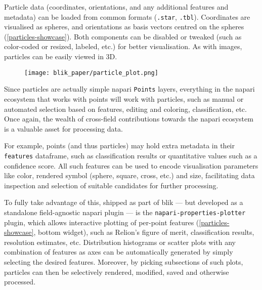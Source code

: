 Particle data (coordinates, orientations, and any additional features and metadata) can be loaded from common formats (\texttt{.star}, \texttt{.tbl}). Coordinates are visualised as spheres, and orientations as basis vectors centred on the spheres (\autoref{particles-showcase}). Both components can be disabled or tweaked (such as color-coded or resized, labeled, etc.) for better visualisation. As with images, particles can be easily viewed in 3D.

\begin{figure}[!ht]
    \centering
    \texttt{[image: blik\_paper/particle\_plot.png]}
    \label{particles-showcase}
\end{figure}

Since particles are actually simple napari \texttt{Points} layers, everything in the napari ecosystem that works with points will work with particles, such as manual or automated selection based on features, editing and coloring, classification, etc. Once again, the wealth of cross-field contributions towards the napari ecosystem is a valuable asset for processing data.

For example, points (and thus particles) may hold extra metadata in their \texttt{features} dataframe, such as classification results or quantitative values such as a confidence score. All such features can be used to encode visualisation parameters like color, rendered symbol (sphere, square, cross, etc.) and size, facilitating data inspection and selection of suitable candidates for further processing.

To fully take advantage of this, shipped as part of blik --- but developed as a standalone field-agnostic napari plugin --- is the \texttt{napari-properties-plotter} plugin, which allows interactive plotting of per-point features (\autoref{particles-showcase}, bottom widget), such as Relion's figure of merit, classification results, resolution estimates, etc. Distribution histograms or scatter plots with any combination of features as axes can be automatically generated by simply selecting the desired features. Moreover, by picking subsections of such plots, particles can then be selectively rendered, modified, saved and otherwise processed.


